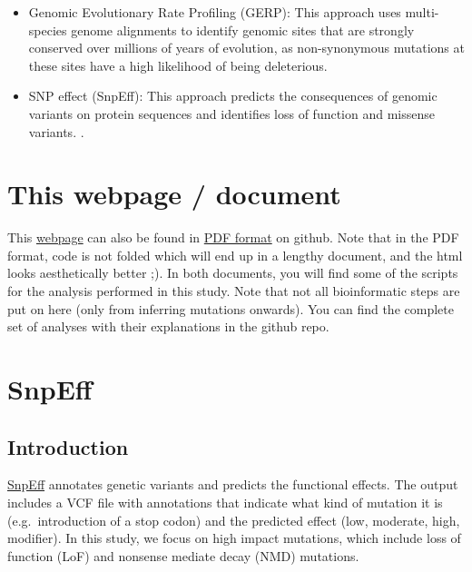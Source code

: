 \documentclass[
  letterpaper,
  DIV=11,
  numbers=noendperiod]{scrreprt}
\begin{document}
\begin{itemize}
\item
  Genomic Evolutionary Rate Profiling (GERP): This approach uses
  multi-species genome alignments to identify genomic sites that are
  strongly conserved over millions of years of evolution, as
  non-synonymous mutations at these sites have a high likelihood of
  being deleterious. \autocite{davydovIdentifyingHighFraction2010}
\item
  SNP effect (SnpEff): This approach predicts the consequences of
  genomic variants on protein sequences and identifies loss of function
  and missense variants. \autocite{cingolani2012}.
\end{itemize}


\hypertarget{this-webpage-document}{%
\chapter{This webpage / document}\label{this-webpage-document}}

This \href{https://rshuhuachen.github.io/ms_load_grouse/}{webpage} can
also be found in
\href{https://github.com/rshuhuachen/ms_load_grouse/docs/Mutation-Load-in-Black-Grouse.pdf}{PDF
format} on github. Note that in the PDF format, code is not folded which
will end up in a lengthy document, and the html looks aesthetically
better ;). In both documents, you will find some of the scripts for the
analysis performed in this study. Note that not all bioinformatic steps
are put on here (only from inferring mutations onwards). You can find
the complete set of analyses with their explanations in the github repo.


\hypertarget{snpeff}{%
\chapter{SnpEff}\label{snpeff}}

\hypertarget{introduction-1}{%
\section{Introduction}\label{introduction-1}}

\href{https://pcingola.github.io/SnpEff/}{SnpEff} annotates genetic
variants and predicts the functional effects. The output includes a VCF
file with annotations that indicate what kind of mutation it is
(e.g.~introduction of a stop codon) and the predicted effect (low,
moderate, high, modifier). In this study, we focus on high impact
mutations, which include loss of function (LoF) and nonsense mediate
decay (NMD) mutations.
\end{document}
